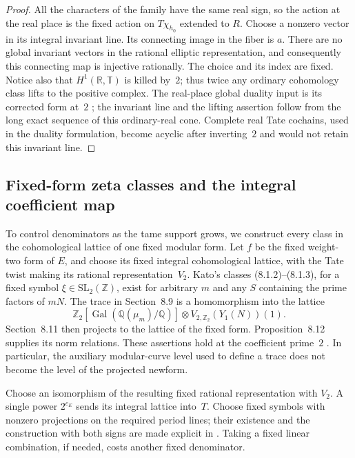 \begin{proof}
All the characters of the family have the same real sign, so the action
at the real place is the fixed action on $T\chi_{h_0}$ extended to $R$.
Choose a nonzero vector in its integral invariant line.  Its connecting
image in the fiber is $a$.  There are no global invariant vectors in the
rational elliptic representation, and consequently this connecting map
is injective rationally.  The choice and its index are fixed.  Notice also
that $H^1(\mathbb R,\mathbb T)$ is killed by~$2$; thus twice any ordinary
cohomology class lifts to the positive complex.  The real-place global duality input is its corrected form at~$2$
\cite[\S\S5.7.1--5.7.5]{Nekovar2006}; the invariant line and the lifting
assertion follow from the long exact sequence of this ordinary-real cone.
Complete real Tate cochains, used in the duality formulation, become
acyclic after inverting~$2$ and would not retain this invariant line.
\end{proof}

\subsection{Fixed-form zeta classes and the integral coefficient map}

To control denominators as the tame support grows, we construct every
class in the cohomological lattice of one fixed modular form.  Let $f$ be the fixed weight-two form of $E$, and choose
its fixed integral cohomological lattice, with the Tate twist making its
rational representation~$V_2$.  Kato's classes (8.1.2)--(8.1.3), for a fixed
symbol $\xi\in\mathrm{SL}_2(\mathbb Z)$, exist for arbitrary $m$ and any
$S$ containing the prime factors of $mN$.  The trace in Section~8.9 is
a homomorphism into the lattice
\[
 \mathbb Z _2[\operatorname{Gal}(\mathbb Q(\mu_m)/\mathbb Q)]
       \otimes V_{2,\mathbb Z _2}(Y_1(N))(1).
\]
Section~8.11 then projects to the lattice of the fixed form.
Proposition~8.12 supplies its norm relations.  These assertions hold at
the coefficient prime~$2$ \cite[Sections~5.1, 8.1, 8.9--8.12]{Kato2004}.
In particular, the auxiliary modular-curve level used to define a trace
does not become the level of the projected newform.

Choose an isomorphism of the resulting fixed rational representation with
$V_2$.  A single power $2^{c_E}$ sends its integral lattice into~$T$.
Choose fixed symbols with nonzero projections on the required period
lines; their existence and the construction with both signs are made
explicit in \cite[Sections~13.6 and 13.9]{Kato2004}.  Taking a fixed linear
combination, if needed, costs another fixed denominator.

